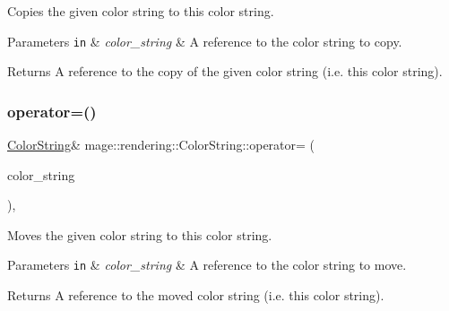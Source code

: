 Copies the given color string to this color string.


\begin{DoxyParams}[1]{Parameters}
\mbox{\tt in}  & {\em color\+\_\+string} & A reference to the color string to copy. \\
\hline
\end{DoxyParams}
\begin{DoxyReturn}{Returns}
A reference to the copy of the given color string (i.\+e. this color string). 
\end{DoxyReturn}
\mbox{\label{classmage_1_1rendering_1_1_color_string_aa70b60e0c8528306e7473ee0b5bfbe03}} 
\subsubsection{\texorpdfstring{operator=()}{operator=()}\hspace{0.1cm}{\footnotesize\ttfamily [2/2]}}
{\footnotesize\ttfamily \mbox{\hyperlink{classmage_1_1rendering_1_1_color_string}{Color\+String}}\& mage\+::rendering\+::\+Color\+String\+::operator= (\begin{DoxyParamCaption}\item[{\mbox{\hyperlink{classmage_1_1rendering_1_1_color_string}{Color\+String}} \&\&}]{color\+\_\+string }\end{DoxyParamCaption})\hspace{0.3cm}{\ttfamily [default]}, {\ttfamily [noexcept]}}

Moves the given color string to this color string.


\begin{DoxyParams}[1]{Parameters}
\mbox{\tt in}  & {\em color\+\_\+string} & A reference to the color string to move. \\
\hline
\end{DoxyParams}
\begin{DoxyReturn}{Returns}
A reference to the moved color string (i.\+e. this color string). 
\end{DoxyReturn}
\mbox{\label{classmage_1_1rendering_1_1_color_string_a3f5139de7675dc21f4f444fae8a1983d}} 
